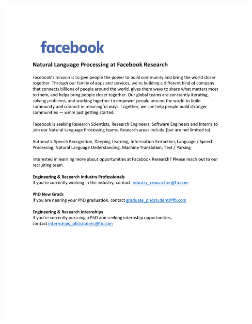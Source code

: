 \begin{center}
  \vfill
  \includegraphics[width=\textwidth]{content/ads/full/facebook.pdf}
  \vfill
\end{center}
\clearpage


